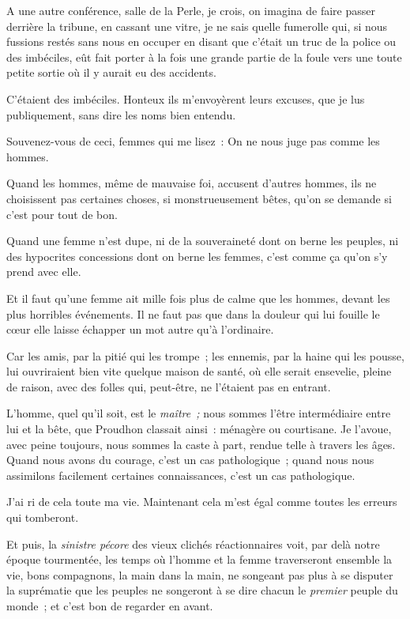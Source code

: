 \documentclass[french,twoside]{book} %
\begin{document}
\noindent A une autre conférence, salle de la Perle, je crois, on imagina de faire passer derrière la tribune, en cassant une vitre, je ne sais quelle fumerolle qui, si nous fussions restés sans nous en occuper en disant que c’était un truc de la police ou des imbéciles, eût fait porter à la fois une grande partie de la foule vers une toute petite sortie où il y aurait eu des accidents.\par
C’étaient des imbéciles. Honteux ils m’envoyèrent leurs excuses, que je lus publiquement, sans dire les noms bien entendu.\par
Souvenez-vous de ceci, femmes qui me lisez : On ne nous juge pas comme les hommes.\par
Quand les hommes, même de mauvaise foi, accusent d’autres hommes, ils ne choisissent pas certaines choses, si monstrueusement bêtes,  qu’on se demande si c’est pour tout de bon.\par
Quand une femme n’est dupe, ni de la souveraineté dont on berne les peuples, ni des hypocrites concessions dont on berne les femmes, c’est comme ça qu’on s’y prend avec elle.\par
Et il faut qu’une femme ait mille fois plus de calme que les hommes, devant les plus horribles événements. Il ne faut pas que dans la douleur qui lui fouille le cœur elle laisse échapper un mot autre qu’à l’ordinaire.\par
Car les amis, par la pitié qui les trompe ; les ennemis, par la haine qui les pousse, lui ouvriraient bien vite quelque maison de santé, où elle serait ensevelie, pleine de raison, avec des folles qui, peut-être, ne l’étaient pas en entrant.\par
L’homme, quel qu’il soit, est le \emph{maître ;} nous sommes l’être intermédiaire entre lui et la bête, que Proudhon classait ainsi : ménagère ou courtisane. Je l’avoue, avec peine toujours, nous sommes la caste à part, rendue telle à travers les âges. Quand nous avons du courage, c’est un cas pathologique ; quand nous nous assimilons facilement certaines connaissances, c’est un cas pathologique.\par
J’ai ri de cela toute ma vie. Maintenant cela m’est égal comme toutes les erreurs qui tomberont.\par
 Et puis, la \emph{sinistre pécore} des vieux clichés réactionnaires voit, par delà notre époque tourmentée, les temps où l’homme et la femme traverseront ensemble la vie, bons compagnons, la main dans la main, ne songeant pas plus à se disputer la suprématie que les peuples ne songeront à se dire chacun le \emph{premier} peuple du monde ; et c’est bon de regarder en avant.\par
\end{document}
